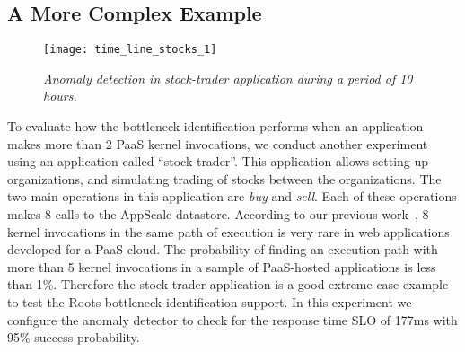 
\subsection{A More Complex Example}

\begin{figure}
\centering
\texttt{[image: time\_line\_stocks\_1]}
\vspace{-0.3in}
\caption{\textit{Anomaly detection in stock-trader application during a period of 10 hours. 
}}
\vspace{-0.1in}
\label{fig:time_line_stocks_1}
\end{figure}


To evaluate how the bottleneck identification performs when an application makes more than 2
PaaS kernel invocations, we conduct another experiment using an application
called ``stock-trader''.
This application allows setting up organizations, and simulating trading of stocks between the
organizations. The two main operations in this application are \textit{buy} and \textit{sell}. Each of
these operations makes 8 calls to the AppScale datastore. 
According to our previous work~\cite{Jayathilaka:2015:RTS:2806777.2806842}, 8 kernel invocations in the
same path of execution is very rare in web applications developed for a PaaS cloud. The probability
of finding an execution path with more than 5 kernel invocations in a sample of PaaS-hosted
applications is less than 1\%. Therefore the stock-trader application is a good extreme case
example to test the Roots bottleneck identification support.
In this experiment we configure the anomaly
detector to check for the response time SLO of 177ms with 95\% success probability.

